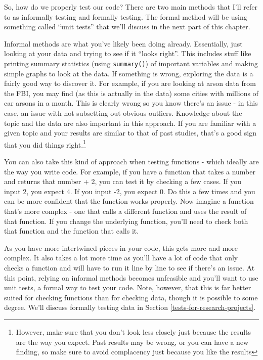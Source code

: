 \documentclass[
  a4paper,
]{krantz}
\begin{document}
So, how do we properly test our code? There are two main
methods that I'll refer to as informally testing and
formally testing. The formal method will be using something
called ``unit tests'' that we'll discuss in the next part of
this chapter.

Informal methods are what you've likely been doing already.
Essentially, just looking at your data and trying to see if
it ``looks right''. This includes stuff like printing
summary statistics (using \texttt{summary()}) of important
variables and making simple graphs to look at the data. If
something is wrong, exploring the data is a fairly good way
to discover it. For example, if you are looking at arson
data from the FBI, you may find (as this is actually in the
data) some cities with millions of car arsons in a month.
This is clearly wrong so you know there's an issue - in this
case, an issue with not subsetting out obvious outliers.
Knowledge about the topic and the data are also important in
this approach. If you are familiar with a given topic and
your results are similar to that of past studies, that's a
good sign that you did things right.\footnote{However, make
  sure that you don't look less closely just because the
  results are the way you expect. Past results may be wrong,
  or you can have a new finding, so make sure to avoid
  complacency just because you like the results}

You can also take this kind of approach when testing
functions - which ideally are the way you write code. For
example, if you have a function that takes a number and
returns that number + 2, you can test it by checking a few
cases. If you input 2, you expect 4. If you input -2, you
expect 0. Do this a few times and you can be more confident
that the function works properly. Now imagine a function
that's more complex - one that calls a different function
and uses the result of that function. If you change the
underlying function, you'll need to check both that function
and the function that calls it.

As you have more intertwined pieces in your code, this gets
more and more complex. It also takes a lot more time as
you'll have a lot of code that only checks a function and
will have to run it line by line to see if there's an issue.
At this point, relying on informal methods becomes
unfeasible and you'll want to use unit tests, a formal way
to test your code. Note, however, that this is far better
suited for checking functions than for checking data, though
it is possible to some degree. We'll discuss formally
testing data in Section \ref{tests-for-research-projects}.
\end{document}
